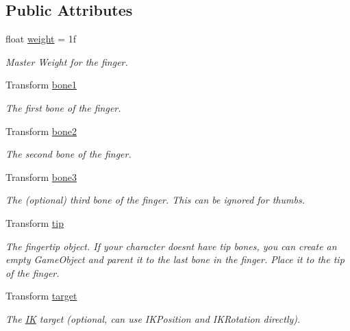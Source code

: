 \subsection*{Public Attributes}
\begin{DoxyCompactItemize}
\item 
float \mbox{\hyperlink{class_root_motion_1_1_final_i_k_1_1_finger_a3f4cdb44118e5c6a8b242ffbffbac71f}{weight}} = 1f
\begin{DoxyCompactList}\small\item\em Master Weight for the finger. \end{DoxyCompactList}\item 
Transform \mbox{\hyperlink{class_root_motion_1_1_final_i_k_1_1_finger_a24de3747cc8d19bff62a9fd8738bd6a1}{bone1}}
\begin{DoxyCompactList}\small\item\em The first bone of the finger. \end{DoxyCompactList}\item 
Transform \mbox{\hyperlink{class_root_motion_1_1_final_i_k_1_1_finger_abc15a27e3f3c80abf25ae8f4fcacc8d5}{bone2}}
\begin{DoxyCompactList}\small\item\em The second bone of the finger. \end{DoxyCompactList}\item 
Transform \mbox{\hyperlink{class_root_motion_1_1_final_i_k_1_1_finger_a54e39bb6774532ac0e36128f010d294a}{bone3}}
\begin{DoxyCompactList}\small\item\em The (optional) third bone of the finger. This can be ignored for thumbs. \end{DoxyCompactList}\item 
Transform \mbox{\hyperlink{class_root_motion_1_1_final_i_k_1_1_finger_a33571b5ae2a49a1c5b601b4f8852c5d5}{tip}}
\begin{DoxyCompactList}\small\item\em The fingertip object. If your character doesn\textquotesingle{}t have tip bones, you can create an empty Game\+Object and parent it to the last bone in the finger. Place it to the tip of the finger. \end{DoxyCompactList}\item 
Transform \mbox{\hyperlink{class_root_motion_1_1_final_i_k_1_1_finger_a51474eeb423e2acf8ac4f33a19055086}{target}}
\begin{DoxyCompactList}\small\item\em The \mbox{\hyperlink{class_root_motion_1_1_final_i_k_1_1_i_k}{IK}} target (optional, can use I\+K\+Position and I\+K\+Rotation directly). \end{DoxyCompactList}\end{DoxyCompactItemize}
